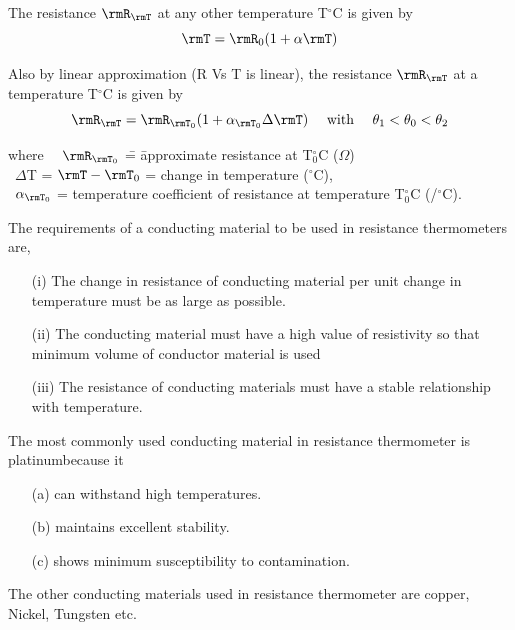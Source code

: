The resistance $\rmR_\rmT$ at any other temperature T$^\circ$C is
given by 
\begin{equation}
\rmT = \rmR_0 (1+\alpha \rmT) \label{eq9.3}
\end{equation}

Also by linear approximation (R Vs T is linear), the resistance
$\rmR_\rmT$ at a temperature T$^\circ$C is given by
$$
\rmR_\rmT = \rmR_{\rmT_0}
(1+ \alpha_{\rmT_0} \Delta \rmT) \quad \text{ with } \quad \theta_1
< \theta_0 < \theta_2
$$
\begin{tabbing}
where ~~$\rmR_{\rmT_0}$ \= = \= approximate resistance at T$^\circ_0$C
($\Omega$)\\[4pt]
\qquad\quad ~$\Delta$T \> = \> $\rmT-\rmT_0$ = change in temperature ($^\circ$C),\\[4pt]
\qquad \quad ~$\alpha_{\rmT_0}$ \> = \> temperature coefficient of resistance at
temperature T$_0^\circ$C (/$^\circ$C).
\end{tabbing}


 The requirements of a conducting material to be used in resistance
 thermometers are,
\begin{itemize}
\item[(i)] The change in resistance of conducting material per unit
 change in temperature must be as large as possible.

\item[(ii)] The conducting material must have a high value of
resistivity so that minimum volume of conductor material is used

\item[(iii)] The resistance of conducting materials must have a stable
relationship with temperature.
\end{itemize}

The most commonly used conducting material in resistance thermometer
is platinum\break because it 
\begin{itemize}
\item[(a)] can withstand high temperatures. 

\item[(b)] maintains excellent stability.

\item[(c)] shows minimum susceptibility to contamination.
\end{itemize}

The other conducting materials used in resistance thermometer are
copper, Nickel, Tungsten etc.


